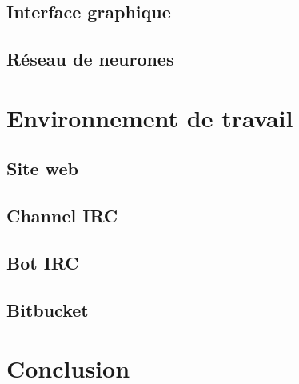 \documentclass[12pt,a4paper]{article}
\begin{document}
\subsection{Interface graphique}

\newpage
\subsection{Réseau de neurones}

\newpage
\section{Environnement de travail}

\subsection{Site web}

\newpage
\subsection{Channel IRC}

\newpage
\subsection{Bot IRC}

\newpage
\subsection{Bitbucket}

\newpage
\section{Conclusion}

\end{document}
